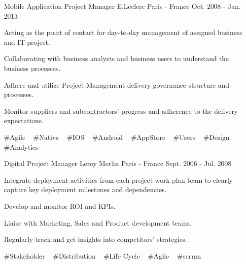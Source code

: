 \begin{cventries}
  \cventry
    {Mobile Application Project Manager} %
    {E.Leclerc} %
    {Paris - France} %
    {Oct. 2008 - Jan. 2013} %
    {
      \begin{cvitems} %
        \item {Acting as the point of contact for day-to-day management of assigned business and IT project.}
        \item {Collaborating with business analysts and business users to understand the business processes.}
        \item {Adhere and utilize Project Management delivery governance structure and processes.}
        \item {Monitor suppliers and subcontractors' progress and adherence to the delivery expectations.}
      \end{cvitems}
    }
    {
      \#Agile ~
      \#Native ~
      \#IOS ~
      \#Android ~
      \#AppStore ~
      \#Users ~
      \#Design ~
      \#Analytics ~
    }

  \cventry
    {Digital Project Manager} %
    {Leroy Merlin} %
    {Paris - France} %
    {Sept. 2006 - Jul. 2008} %
    {
      \begin{cvitems} %
        \item {Integrate deployment activities from each project work plan team to clearly capture key deployment milestones and dependencies.}
        \item {Develop and monitor ROI and KPIs.}
        \item {Liaise with Marketing, Sales and Product development teams.}
        \item {Regularly track and get insights into competitors' strategies.}
      \end{cvitems}
    }
    {
      \#Stakeholder ~
      \#Distribution ~
      \#Life Cycle ~
      \#Agile ~
      \#scrum ~
    }

\end{cventries}
